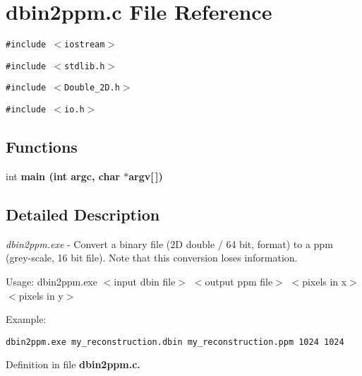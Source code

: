 \section{dbin2ppm.c File Reference}
\label{dbin2ppm_8c}
{\tt \#include $<$iostream$>$}\par
{\tt \#include $<$stdlib.h$>$}\par
{\tt \#include $<$Double\_\-2D.h$>$}\par
{\tt \#include $<$io.h$>$}\par
\subsection*{Functions}
\begin{CompactItemize}
\item 
int \bf{main} (int argc, char $\ast$argv[$\,$])\label{dbin2ppm_8c_28052c36c3b61c6c0eaa18f5d226118f}

\end{CompactItemize}


\subsection{Detailed Description}
{\em dbin2ppm.exe\/} - Convert a binary file (2D double / 64 bit, format) to a ppm (grey-scale, 16 bit file). Note that this conversion loses information.

\begin{Desc}
\item[Usage: dbin2ppm.exe $<$input dbin file$>$ $<$output ppm file$>$]$<$pixels in x$>$ $<$pixels in y$>$\end{Desc}
\begin{Desc}
\item[]\end{Desc}
\begin{Desc}
\item[Example:]

\footnotesize\begin{verbatim}dbin2ppm.exe my_reconstruction.dbin my_reconstruction.ppm 1024 1024 \end{verbatim}
\normalsize
 \end{Desc}


Definition in file \bf{dbin2ppm.c}.